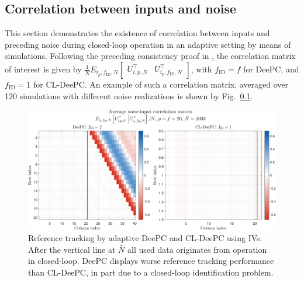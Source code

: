 \subsection{Correlation between inputs and noise}
This section demonstrates the existence of correlation between inputs and preceding noise during closed-loop operation in an adaptive setting by means of simulations. Following the preceding consistency proof in , the correlation matrix of interest is given by $\frac{1}{N}E_{i_p,f_\mathrm{ID},N}\begin{bmatrix}U_{i,p,N}^\top & U_{i_p,f_\mathrm{ID},N}^\top\end{bmatrix}$, with $f_\mathrm{ID}=f$ for \ac{DeePC}, and $f_\mathrm{ID}=1$ for \ac{CL-DeePC}. An example of such a correlation matrix, averaged over 120 simulations with different noise realizations is shown by Fig.~\ref{}.
\begin{figure}[b!]
\begin{center}
\includegraphics[width=\columnwidth]{results/figures/Correlation_Nbar_1039_p_20_f_20_Re_1_Ru_1_Rdu_0_Q_100_R_0_dR_10.pdf}    %
\caption{Reference tracking by adaptive \ac{DeePC} and \ac{CL-DeePC} using \ac{IVs}. After the vertical line at $\bar{N}$ all used data originates from operation in closed-loop. \ac{DeePC} displays worse reference tracking performance than \ac{CL-DeePC}, in part due to a closed-loop identification problem.}  %
\label{fig:CL_Problem_Solution}                                 %
\end{center}                                 %
\end{figure}
